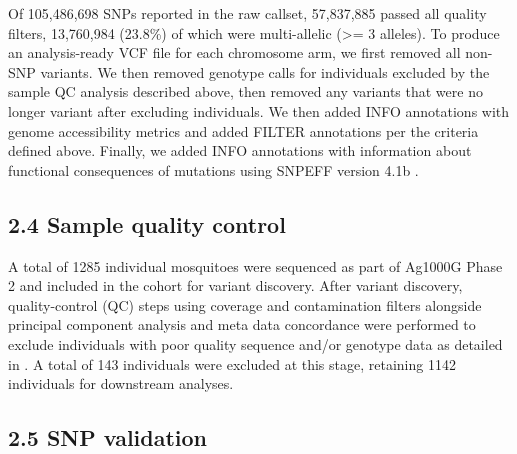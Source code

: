 \documentclass[a4paper,11pt,abstracton,hidelinks]{scrartcl}
\begin{document}
%
Of 105,486,698 SNPs reported in the raw callset, 57,837,885 passed all quality filters, 13,760,984 (23.8\%) of which were multi-allelic (>= 3 alleles).
%
To produce an analysis-ready VCF file for each chromosome arm, we first removed all non-SNP variants. 
%
We then removed genotype calls for individuals excluded by the sample QC analysis described above, then removed any variants that were no longer variant after excluding individuals. 
%
We then added INFO annotations with genome accessibility metrics and added FILTER annotations per the criteria defined above. 
%
Finally, we added INFO annotations with information about functional consequences of mutations using SNPEFF version 4.1b \cite{Cingolani2012}.


\subsection*{2.4 Sample quality control}
%
A total of 1285 individual mosquitoes were sequenced as part of Ag1000G Phase 2 and included in the cohort for variant discovery. 
%
After variant discovery, quality-control (QC) steps using coverage and contamination filters alongside principal component analysis and meta data concordance were performed to exclude individuals with poor quality sequence and/or genotype data as detailed in \cite{Ag1000gConsortium2017}.
%
A total of 143 individuals were excluded at this stage, retaining 1142 individuals for downstream analyses.



\subsection*{2.5 SNP validation}
\end{document}
